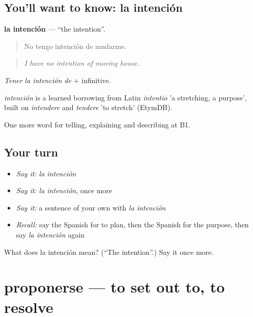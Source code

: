 \subsection*{You'll want to know: la intención}
\textbf{la intención} — \textquotedblleft{}the intention\textquotedblright{}.

\begin{quote}
No tengo intención de mudarme.
\end{quote}

\begin{quote}
\emph{I have no intention of moving house.}
\end{quote}

\emph{Tener la intención de} + infinitive.

\begin{cousinweb}
\emph{intención} is a learned borrowing from Latin \emph{intentio} 'a stretching, a purpose', built on \emph{intendere} and \emph{tendere} 'to stretch' (EtymDB).
\end{cousinweb}

\begin{grammarlens}[title={What you've built}]
One more word for telling, explaining and describing at B1.
\end{grammarlens}

\subsection*{Your turn}
\begin{itemize}
\raggedright
  \item \emph{Say it:} \emph{la intención}
  \item \emph{Say it:} \emph{la intención}, once more
  \item \emph{Say it:} a sentence of your own with \emph{la intención}
  \item \emph{Recall:} say the Spanish for to plan, then the Spanish for the purpose, then say \emph{la intención} again
\end{itemize}

\begin{tcolorbox}[breakable,colback=teal!4,colframe=teal!35!black,title={Before you move on}]
What does la intención mean? (\textquotedblleft{}The intention\textquotedblright{}.) Say it once more.
\end{tcolorbox}
\section[proponerse]{proponerse — to set out to, to resolve}

